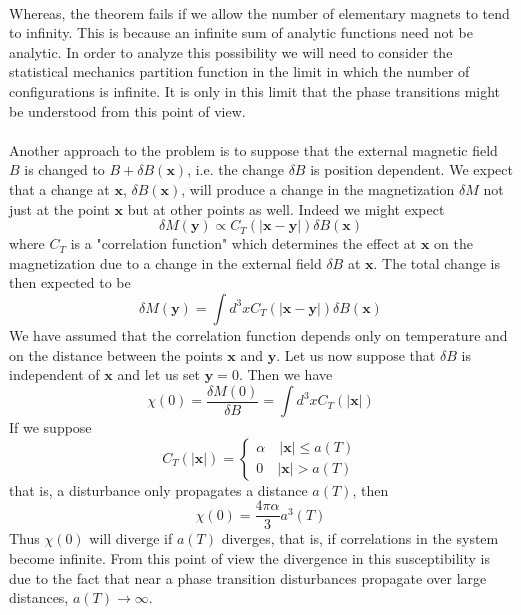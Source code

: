 \\
Whereas, the theorem fails if we allow the number of elementary magnets to tend to infinity. This is because an infinite sum of analytic functions need not be analytic. 
In order to analyze this possibility we will need to consider the statistical mechanics partition function in the limit in which the number of configurations is infinite. It is only in this limit that the phase transitions might be understood from this point of view.
\\ \\
Another approach to the problem is to suppose that the external magnetic field $B$ is changed to $B + \delta B(\bm{x})$, i.e. the change $\delta B$ is position dependent. We expect that a change at $\bm{x}$, $\delta B(\bm{x})$, will produce a change in the magnetization $\delta M$ not just at the point $\bm{x}$ but at other points as well. Indeed we might expect
\[\delta M(\bm{y}) \propto C_T(|\bm{x}-\bm{y}|)\delta B(\bm{x})\]
where $C_T$ is a "correlation function" which determines the effect at $\bm{x}$ on the magnetization due to a change in the external field $\delta B$ at $\bm{x}$. The total change
is then expected to be
\[\delta M(\bm{y}) = \int d^3x C_T(|\bm{x}-\bm{y}|)\delta B(\bm{x})\]
We have assumed that the correlation function depends only on temperature and on the distance between the points $\bm{x}$ and $\bm{y}$.
Let us now suppose that $\delta B$ is independent of $\bm{x}$ and let us set $\bm{y} = 0$. Then we have
\[\chi(0) = \frac{\delta M(0)}{\delta B} = \int d^3x C_T(|\bm{x}|)\]
If we suppose
\[C_T(|\bm{x}|) = \begin{cases} \alpha \quad |\bm{x}| \leq a(T) \\ 0 \quad |\bm{x}| > a(T) \end{cases}\]
that is, a disturbance only propagates a distance $a(T)$, then
\[\chi(0) = \frac{4\pi \alpha}{3} a^3(T)\]
Thus $\chi(0)$ will diverge if $a(T)$ diverges, that is, if correlations in the system become infinite. From this point of view the divergence in this susceptibility is due to the fact that near a phase transition disturbances propagate over large distances, $a(T) \to \infty$. 

